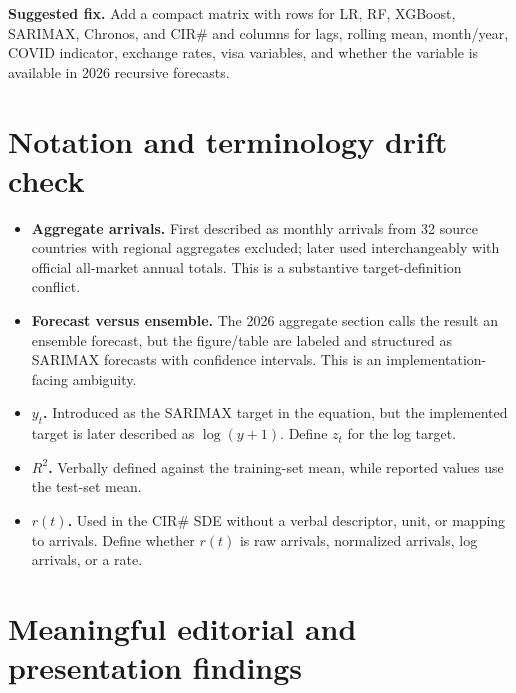 \documentclass[11pt]{article}
\begin{document}
\textbf{Suggested fix.} Add a compact matrix with rows for LR, RF, XGBoost, SARIMAX, Chronos, and CIR\# and columns for lags, rolling mean, month/year, COVID indicator, exchange rates, visa variables, and whether the variable is available in 2026 recursive forecasts.

\section*{Notation and terminology drift check}

\begin{itemize}
\item \textbf{Aggregate arrivals.} First described as monthly arrivals from 32 source countries with regional aggregates excluded; later used interchangeably with official all-market annual totals. This is a substantive target-definition conflict.
\item \textbf{Forecast versus ensemble.} The 2026 aggregate section calls the result an ensemble forecast, but the figure/table are labeled and structured as SARIMAX forecasts with confidence intervals. This is an implementation-facing ambiguity.
\item \textbf{\(y_t\).} Introduced as the SARIMAX target in the equation, but the implemented target is later described as \(\log(y+1)\). Define \(z_t\) for the log target.
\item \textbf{\(R^2\).} Verbally defined against the training-set mean, while reported values use the test-set mean.
\item \textbf{\(r(t)\).} Used in the CIR\# SDE without a verbal descriptor, unit, or mapping to arrivals. Define whether \(r(t)\) is raw arrivals, normalized arrivals, log arrivals, or a rate.
\end{itemize}

\section*{Meaningful editorial and presentation findings}
\end{document}
